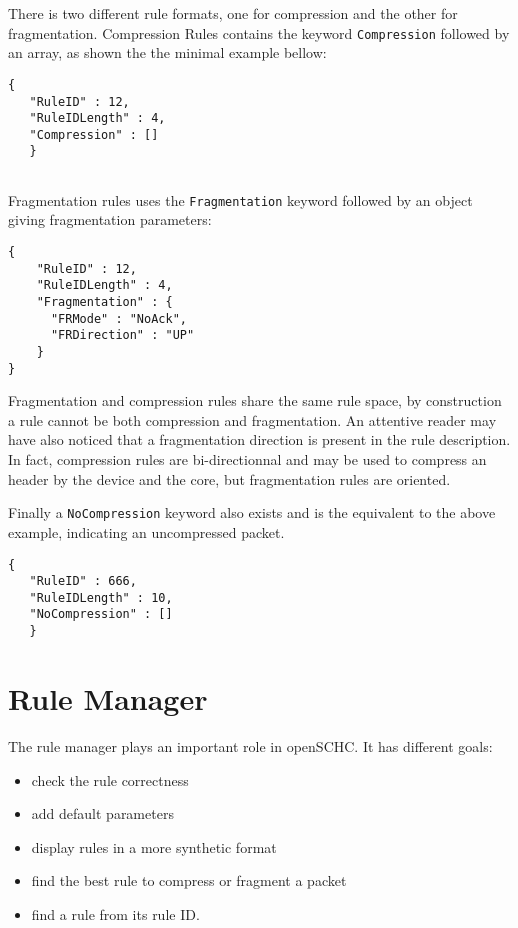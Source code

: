 \documentclass[onecolumn,12pt]{book}
\newcounter{c}
\begin{document}
There is two different rule formats, one for compression and the other for fragmentation. Compression Rules contains the keyword \texttt{Compression} followed by an array, as shown the the minimal example bellow: 

\begin{lstlisting}[backgroundcolor=\color{yellow}]
   {
   "RuleID" : 12,
   "RuleIDLength" : 4,
   "Compression" : []
   }
   
\end{lstlisting}

   
Fragmentation rules uses the \texttt{Fragmentation} keyword followed by an object giving fragmentation parameters:

\begin{lstlisting}[backgroundcolor=\color{yellow}]
    {
    "RuleID" : 12,
    "RuleIDLength" : 4,
    "Fragmentation" : {
      "FRMode" : "NoAck",
      "FRDirection" : "UP"
    }
}
\end{lstlisting}

Fragmentation and compression rules share the same rule space, by construction a rule cannot be both compression and fragmentation. 
An attentive reader may have also noticed that a fragmentation direction is present in the rule description. 
In fact, compression rules are bi-directionnal and may be used to compress an header by the device and the core, but fragmentation rules are oriented.  

Finally a \texttt{NoCompression} keyword also exists and is the equivalent to the above example, indicating an uncompressed packet.

\begin{lstlisting}[backgroundcolor=\color{yellow}]
   {
   "RuleID" : 666,
   "RuleIDLength" : 10,
   "NoCompression" : []
   }
\end{lstlisting}


\section{Rule Manager}

The rule manager plays an important role in openSCHC. It has different goals:
\begin{itemize}
    \item check the rule correctness
    \item add default parameters
    \item display rules in a more synthetic format
    \item find the best rule to compress or fragment a packet
    \item find a rule from its rule ID.
\end{itemize}
\end{document}

